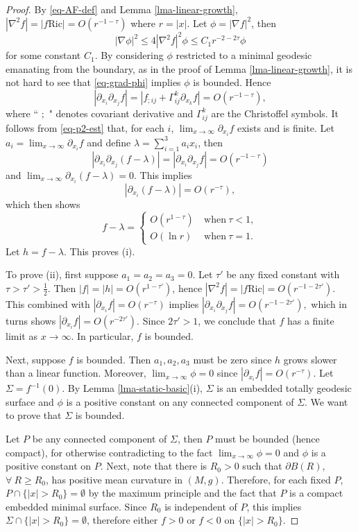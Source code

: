 \documentclass[12pt]{amsart}
\theoremstyle{remark}
\numberwithin{equation}{section}
\newcommand{\Ric}{\mbox{Ric}}
\newcommand{\be}{\begin{equation}}
\newcommand{\ee}{\end{equation}}
\def\p{\partial}
\def\lf{\left}
\def\ri{\right}
\begin{document}
\begin{proof}
By   \eqref{eq-AF-def} and Lemma \ref{lma-linear-growth},
$ |\nabla^2 f|=|f\Ric|=O(r^{-1-\tau})$ where $ r = | x|$.
Let $\phi=|\nabla f|^2$, then
\be \label{eq-grad-phi}
|\nabla\phi|^2\le 4|\nabla^2f|^2 \phi \le C_1r^{-2-2\tau}\phi
\ee
for some constant $C_1$.
By considering $\phi$ restricted to a minimal geodesic emanating from the boundary,  as in the proof of Lemma \ref{lma-linear-growth},
it is not hard to see that  \eqref{eq-grad-phi}  implies  $\phi$ is bounded. Hence
\be \label{eq-p2-est}
|\p_{x_i}\p_{x_j}f|=|f_{;ij}+\Gamma_{ij}^k\p_{x_k}f|=O(r^{-1-\tau}),
\ee
where `` $;$ " denotes covariant derivative   and $\Gamma^k_{ij}$ are the Christoffel symbols.
It follows from \eqref{eq-p2-est} that, for each $i$,
$ \lim_{x\to\infty}\p_{x_i}f $ exists and is finite.  Let $  a_i =  \lim_{x\to\infty}\p_{x_i}f  $ and define
$\lambda=\sum_{i=1}^3a_ix_i $, then
 $$
 |\p_{x_i}\p_{x_j}(f-\lambda)|=|\p_{x_i}\p_{x_j}f|=O(r^{-1-\tau})
 $$
 and
 $
\lim_{x\to\infty}\p_{x_i}(f-\lambda)=0.
$
This  implies
$$|\p_{x_i} (f-\lambda)|=O(r^{-\tau}),
$$
which then  shows
\be
f - \lambda=
\lf\{
\begin{array}{lc}
O(r^{1-\tau}) & \  \mathrm{when} \   \tau < 1, \\
 O ( \ln r ) & \  \mathrm{when}   \ \tau = 1.
 \end{array}
 \ri.
 \ee
 Let $h=f-\lambda$. This proves (i).


To prove (ii), first  suppose   $a_1=a_2=a_3=0$.
 Let $ \tau' $ be any fixed constant with $ \tau > \tau' > \frac12$.
 Then $ | f | = | h | = O ( r^{1 - \tau'})$, hence
 $ |\nabla^2 f|=|f\Ric|=O(r^{-1- 2 \tau'}) $. This combined with  $|\p_{x_i}f|=O(r^{-\tau})$  implies
 $|\p_{x_i}\p_{x_j}f|=O(r^{-1-2\tau'}) ,$
which  in turns shows  $ |\p_{x_i}f|=O(r^{-2\tau'})$. Since $2\tau'>1$, we conclude  that
$f$ has a finite limit as $x \rightarrow \infty$.
In particular, $f$ is bounded.

Next,  suppose $f$ is bounded.
Then $ a_1, a_2, a_3 $ must be zero since $h$ grows slower than a linear function.
Moreover,  $ \lim_{x \rightarrow \infty} \phi = 0$ since  $ | \p_{x_i} f | = O ( r^{- \tau} )$.
Let $ \Sigma=f^{-1}(0) $.
 By Lemma \ref{lma-static-basic}(i),  $ \Sigma$
is an embedded  totally geodesic surface and $\phi$ is a positive constant on any
connected component of $\Sigma$.  We want to prove that $\Sigma$ is bounded.

Let $P$ be any connected component of $\Sigma$,
then $P$ must be bounded (hence compact),
for otherwise contradicting to the fact $ \lim_{x \rightarrow \infty} \phi = 0 $
and $ \phi $ is a positive constant on $P$.
Next, note that there is $R_0>0$ such that $\p B(R)$, $\forall \  R\ge R_0$,
has positive mean curvature in  $(M, g)$.  Therefore,  for each fixed $P$,
 $P \cap \{ | x | > R_0 \} = \emptyset $ by the maximum principle and
 the fact that $P$ is a compact  embedded minimal surface.
 Since $R_0$ is independent of $P$, this implies  $\Sigma\cap \{ | x | > R_0 \} = \emptyset$,
 therefore either  $ f > 0 $ or $f < 0 $ on $\{ | x | > R_0 \}$.


\end{proof}
\end{document}
